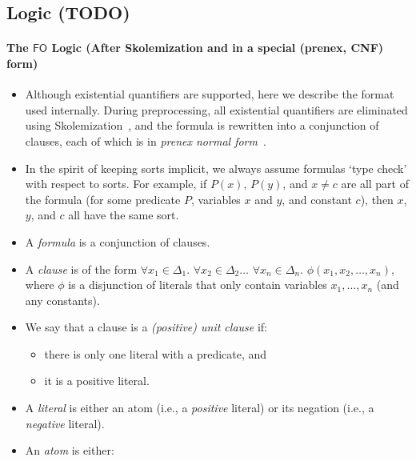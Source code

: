 \documentclass{article}
\theoremstyle{definition}
\newcommand{\FO}{$\mathsf{FO}$}
\begin{document}
\subsection{Logic (TODO)}\label{sec:logic}


\paragraph{The \FO{} Logic (After Skolemization and in a special (prenex, CNF)
  form)}
\begin{itemize}
  \item Although existential quantifiers are supported, here we describe the
        format used internally. During preprocessing, all existential
        quantifiers are eliminated using
        Skolemization~\cite{DBLP:conf/kr/BroeckMD14}, and the formula is
        rewritten into a conjunction of clauses, each of which is in
        \emph{prenex normal form}~\cite{hinman2018fundamentals}.
  \item In the spirit of keeping sorts implicit, we always assume formulas `type
        check' with respect to sorts. For example, if $P(x)$, $P(y)$, and
        $x \ne c$ are all part of the formula (for some predicate $P$, variables
        $x$ and $y$, and constant $c$), then $x$, $y$, and $c$ all have the same
        sort.
  \item A \emph{formula} is a conjunction of clauses.
  \item A \emph{clause} is of the form $\forall x_{1} \in \Delta_{1}\text{.
        }\forall x_{2} \in \Delta_{2}\dots\text{
        }\forall x_{n} \in \Delta_{n}\text{. }\phi(x_{1}, x_{2}, \dots, x_{n})$,
        where $\phi$ is a disjunction of literals that only contain variables
        $x_{1}, \dots, x_{n}$ (and any constants).
  \item We say that a clause is a \emph{(positive) unit clause} if:
        \begin{itemize}
          \item there is only one literal with a predicate, and
          \item it is a positive literal.
        \end{itemize}
  \item A \emph{literal} is either an atom (i.e., a \emph{positive} literal) or
        its negation (i.e., a \emph{negative} literal).
  \item An \emph{atom} is either:

\end{itemize}
\end{document}
